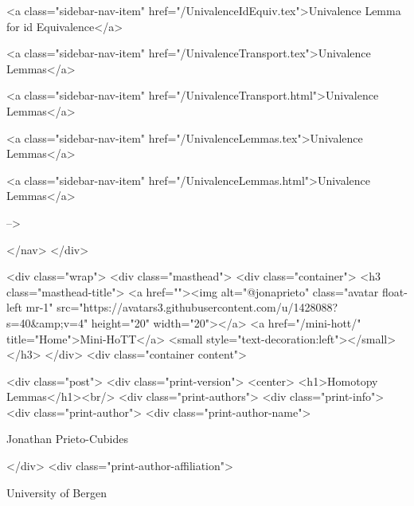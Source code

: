       
        
          <a class="sidebar-nav-item" href="/UnivalenceIdEquiv.tex">Univalence Lemma for id Equivalence</a>
        
      
    
      
        
          <a class="sidebar-nav-item" href="/UnivalenceTransport.tex">Univalence Lemmas</a>
        
      
    
      
        
          <a class="sidebar-nav-item" href="/UnivalenceTransport.html">Univalence Lemmas</a>
        
      
    
      
        
          <a class="sidebar-nav-item" href="/UnivalenceLemmas.tex">Univalence Lemmas</a>
        
      
    
      
        
          <a class="sidebar-nav-item" href="/UnivalenceLemmas.html">Univalence Lemmas</a>
        
      
     -->

  </nav>
</div>

    <div class="wrap">
      <div class="masthead">
        <div class="container">
          <h3 class="masthead-title">
            <a href=""><img alt="@jonaprieto" class="avatar float-left mr-1" src="https://avatars3.githubusercontent.com/u/1428088?s=40&amp;v=4" height="20" width="20"></a>
            <a href="/mini-hott/" title="Home">Mini-HoTT</a>
            <small style="text-decoration:left"></small>
          </h3>
        </div>
      <div class="container content">
        







<div class="post">
  <div class="print-version">
    <center>
      <h1>Homotopy Lemmas</h1><br/>
        <div class="print-authors">
          <div class="print-info">
            <div class="print-author">
              <div class="print-author-name">
                
                  Jonathan Prieto-Cubides
                
              </div>
              <div class="print-author-affiliation">
                
                  University of Bergen
                
